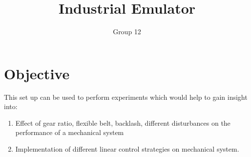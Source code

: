 \documentclass[11pt, a4paper]{article}
\title{\textbf{Industrial Emulator}}
\author{Group 12}
\begin{document}
\maketitle
\newpage
\tableofcontents
\newpage
\section{Objective}
This set up can be used to perform experiments which would help to gain insight into: \\
\begin{enumerate}[label=(\alph*)]
\item Effect of gear ratio, flexible belt, backlash, different disturbances on the performance of a mechanical system 
\item Implementation of different linear control strategies on mechanical system.
\end{enumerate}
\end{document}
